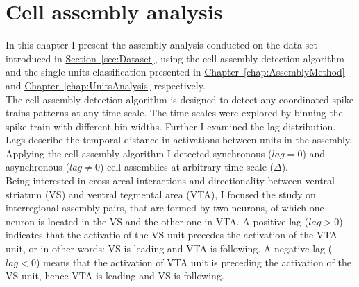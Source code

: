 \chapter{Cell assembly analysis}
\label{chap:AssemblyAnalysis}
In this chapter I present the assembly analysis conducted on the data set introduced in \hyperref[sec:Dataset]{Section~\ref*{sec:Dataset}}, using the cell assembly detection algorithm and the single units classification presented in \hyperref[chap:AssemblyMethod]{Chapter~\ref*{chap:AssemblyMethod}} and \hyperref[chap:UnitsAnalysis]{Chapter~\ref*{chap:UnitsAnalysis}} respectively.\\
The cell assembly detection algorithm is designed to detect any coordinated spike trains patterns at any time scale. The time scales were explored by binning the spike train with different bin-widths. Further I examined the lag distribution. Lags describe the temporal distance in activations between units in the assembly. Applying the cell-assembly algorithm I detected synchronous ($lag=0$) and asynchronous ($lag\neq0$) cell assemblies at arbitrary time scale ($\Delta$).\\Being interested in cross areal interactions and directionality between ventral striatum (VS) and ventral tegmental area (VTA), I focused the study on interregional assembly-pairs, that are formed by two neurons, of which one neuron is located in the VS and the other one in VTA. A positive lag ($lag>0$) indicates that the activatio of the VS unit precedes the activation of the VTA unit, or in other words: VS is leading and VTA is following. A negative lag ($lag<0$) means that the activation of VTA unit is preceding the activation of the VS unit, hence VTA is leading and VS is following.
